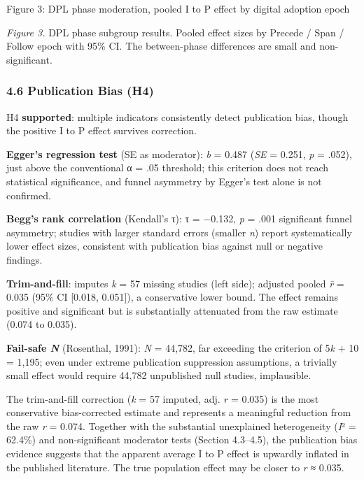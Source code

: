 \documentclass[
  12pt,a4paper]{article}
\begin{document}
Figure 3: DPL phase moderation, pooled I to P effect by digital adoption
epoch

\emph{Figure 3.} DPL phase subgroup results. Pooled effect sizes by
Precede / Span / Follow epoch with 95\% CI. The between-phase
differences are small and non-significant.

\hypertarget{publication-bias-h4}{%
\subsubsection{4.6 Publication Bias (H4)}\label{publication-bias-h4}}

H4 \textbf{supported}: multiple indicators consistently detect
publication bias, though the positive I to P effect survives correction.

\textbf{Egger's regression test} (SE as moderator): \emph{b} = 0.487
(\emph{SE} = 0.251, \emph{p} = .052), just above the conventional α =
.05 threshold; this criterion does not reach statistical significance,
and funnel asymmetry by Egger's test alone is not confirmed.

\textbf{Begg's rank correlation} (Kendall's τ): τ = −0.132, \emph{p} =
.001 significant funnel asymmetry; studies with larger standard errors
(smaller \emph{n}) report systematically lower effect sizes, consistent
with publication bias against null or negative findings.

\textbf{Trim-and-fill}: imputes \emph{k} = 57 missing studies (left
side); adjusted pooled \emph{r̄} = 0.035 (95\% CI {[}0.018, 0.051{]}), a
conservative lower bound. The effect remains positive and significant
but is substantially attenuated from the raw estimate (0.074 to 0.035).

\textbf{Fail-safe \emph{N}} (Rosenthal, 1991): \emph{N} = 44,782, far
exceeding the criterion of 5\emph{k} + 10 = 1,195; even under extreme
publication suppression assumptions, a trivially small effect would
require 44,782 unpublished null studies, implausible.

The trim-and-fill correction (\emph{k} = 57 imputed, adj. \emph{r} =
0.035) is the most conservative bias-corrected estimate and represents a
meaningful reduction from the raw \emph{r} = 0.074. Together with the
substantial unexplained heterogeneity (\emph{I}² = 62.4\%) and
non-significant moderator tests (Section 4.3--4.5), the publication bias
evidence suggests that the apparent average I to P effect is upwardly
inflated in the published literature. The true population effect may be
closer to \emph{r} ≈ 0.035.
\end{document}
